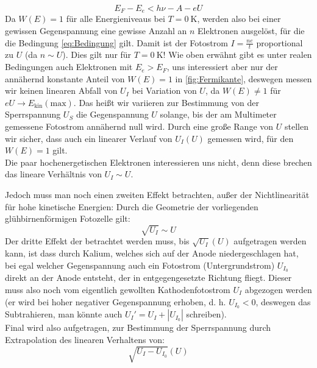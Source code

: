 \begin{equation}
  E_F-E_e<h\nu-A-eU
  \label{eq:Bedingung}
\end{equation}
Da \(W(E)=1\) für alle Energieniveaus bei \(T = \qty{0}{\K}\), werden also bei einer gewissen Gegenspannung eine gewisse Anzahl an \(n\) Elektronen ausgelöst, für die die Bedingung \cref{eq:Bedingung} gilt. Damit ist der Fotostrom \(I=\frac{ne}{t}\) proportional zu \(U\) (da \(n\sim U\)). 
Dies gilt nur für \(T = \qty{0}{\K}\)! Wie oben erwähnt gibt es unter realen Bedingungen auch Elektronen mit \(E_e>E_F\), uns interessiert aber nur der annähernd konstante Anteil von \(W(E)=1\) in \cref{fig:Fermikante}, deswegen messen wir keinen linearen Abfall von \(U_I\) bei Variation von \(U\), da \(W(E)\neq 1\) für \(eU\rightarrow E_{\text{kin}}(\text{max})\).  
Das heißt wir variieren zur Bestimmung von der Sperrspannung \(U_S\) die Gegenspannung \(U\) solange, bis der am Multimeter gemessene Fotostrom annähernd null wird. Durch eine große Range von \(U\) stellen wir sicher, dass auch ein linearer Verlauf von \(U_I(U)\) gemessen wird, für den \(W(E)=1\) gilt. \\
Die paar hochenergetischen Elektronen interessieren uns nicht, denn diese brechen das lineare Verhältnis von \(U_I\sim U\).

Jedoch muss man noch einen zweiten Effekt betrachten, außer der Nichtlinearität für hohe kinetische Energien: Durch die Geometrie der vorliegenden glühbirnenförmigen Fotozelle gilt:
\[\sqrt{U_I}\sim U\]
Der dritte Effekt der betrachtet werden muss, bis \(\sqrt{U_I}(U)\) aufgetragen werden kann, ist dass durch Kalium, welches sich auf der Anode niedergeschlagen hat, bei egal welcher Gegenspannung auch ein Fotostrom (Untergrundstrom) \(U_{I_0}\) direkt an der Anode entsteht, der in entgegengesetzte Richtung fliegt. Dieser muss also noch vom eigentlich gewollten Kathodenfotostrom \(U_I\) abgezogen werden (er wird bei hoher negativer Gegenspannung erhoben, d. h. \(U_{I_0}<0\), deswegen das Subtrahieren, man könnte auch \(U_I'=U_I+|U_{I_0}|\) schreiben).\\
Final wird also aufgetragen, zur Bestimmung der Sperrspannung durch Extrapolation des linearen Verhaltens von: 
\begin{equation}
    \sqrt{U_I-U_{I_0}}(U)
\end{equation}

